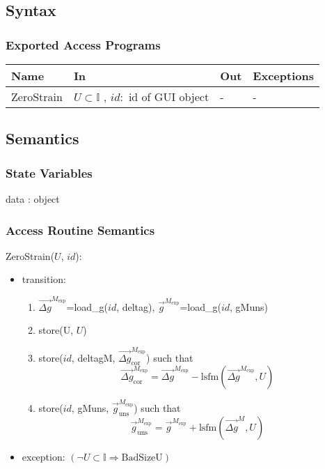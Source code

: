 \documentclass[12pt, titlepage]{article}
\begin{document}
\subsection{Syntax}

\subsubsection{Exported Access Programs}

\begin{center}
\begin{tabular}{p{2.5cm} p{5cm} p{2cm} p{3cm}}
\hline
\textbf{Name} & \textbf{In} & \textbf{Out} & \textbf{Exceptions} \\
\hline
ZeroStrain & $U \subset \mathbb{I}$ , $id :$ id of GUI object & - & - \\
\hline
\end{tabular}
\end{center}

\subsection{Semantics}

\subsubsection{State Variables}

data : object

\subsubsection{Access Routine Semantics}

\noindent ZeroStrain($U$, $id$):
\begin{itemize}  
\item transition:
	\begin{enumerate}
	\item $\overrightarrow{\Delta g}^{M_{\text{exp}}}$=load{\_}g($id$, deltag), 
$\overrightarrow{g}^{M_{\text{exp}}}$=load{\_}g($id$, gMuns)
	\item store(U, $U$)
	\item store($id$, deltagM, $\overrightarrow{\Delta 
g}_{\text{cor}}^{M_{\text{exp}}}$) such that
	\begin{equation*}
\overrightarrow{\Delta g}_{\text{cor}}^{M_{\text{exp}}} = \overrightarrow{\Delta 
g}^{M_{\text{exp}}} - \text{lsfm}(\overrightarrow{\Delta g}^{M_{\text{exp}}},U)
	\end{equation*}
	\item store($id$, gMuns, $\overrightarrow{g}_{\text{uns}}^{M_{\text{exp}}}$) 
such that
	\begin{equation*}
\overrightarrow{g}_{\text{uns}}^{M_{\text{exp}}} = 
\overrightarrow{g}^{M_{\text{exp}}} + \text{lsfm}(\overrightarrow{\Delta g}^M,U)
	\end{equation*}
	\end{enumerate}	 
\item exception:\newline
$(\neg U \subset \mathbb{I} \Rightarrow \text{BadSizeU})$
\end{itemize}
\end{document}
